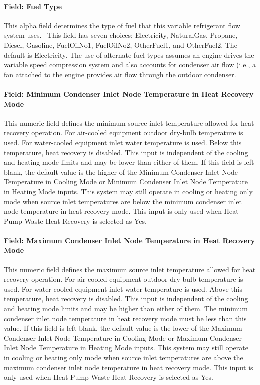\paragraph{Field: Fuel Type}\label{field-fuel-type-005}

This alpha field determines the type of fuel that this variable refrigerant flow system uses.~ This field has seven choices: Electricity, NaturalGas, Propane, Diesel, Gasoline, FuelOilNo1, FuelOilNo2, OtherFuel1, and OtherFuel2. The default is Electricity. The use of alternate fuel types assumes an engine drives the variable speed compression system and also accounts for condenser air flow (i.e., a fan attached to the engine provides air flow through the outdoor condenser.

\paragraph{Field: Minimum Condenser Inlet Node Temperature in Heat Recovery Mode}\label{field-minimum-condenser-inlet-node-temperature-in-heat-recovery-mode-000}

This numeric field defines the minimum source inlet temperature allowed for heat recovery operation. For air-cooled equipment outdoor dry-bulb temperature is used. For water-cooled equipment inlet water temperature is used. Below this temperature, heat recovery is disabled. This input is independent of the cooling and heating mode limits and may be lower than either of them. If this field is left blank, the default value is the higher of the Minimum Condenser Inlet Node Temperature in Cooling Mode or Minimum Condenser Inlet Node Temperature in Heating Mode inputs. This system may still operate in cooling or heating only mode when source inlet temperatures are below the minimum condenser inlet node temperature in heat recovery mode. This input is only used when Heat Pump Waste Heat Recovery is selected as Yes.

\paragraph{Field: Maximum Condenser Inlet Node Temperature in Heat Recovery Mode}\label{field-maximum-condenser-inlet-node-temperature-in-heat-recovery-mode-000}

This numeric field defines the maximum source inlet temperature allowed for heat recovery operation. For air-cooled equipment outdoor dry-bulb temperature is used. For water-cooled equipment inlet water temperature is used. Above this temperature, heat recovery is disabled. This input is independent of the cooling and heating mode limits and may be higher than either of them. The minimum condenser inlet node temperature in heat recovery mode must be less than this value. If this field is left blank, the default value is the lower of the Maximum Condenser Inlet Node Temperature in Cooling Mode or Maximum Condenser Inlet Node Temperature in Heating Mode inputs. This system may still operate in cooling or heating only mode when source inlet temperatures are above the maximum condenser inlet node temperature in heat recovery mode. This input is only used when Heat Pump Waste Heat Recovery is selected as Yes.

